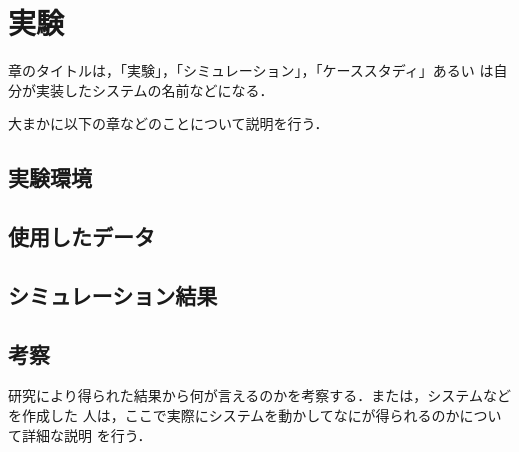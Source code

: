 \chapter{実験}
章のタイトルは，「実験」，「シミュレーション」，「ケーススタディ」あるい
は自分が実装したシステムの名前などになる．

大まかに以下の章などのことについて説明を行う．
\section{実験環境}
\section{使用したデータ}
\section{シミュレーション結果}
\section{考察}
研究により得られた結果から何が言えるのかを考察する．または，システムなどを作成した
人は，ここで実際にシステムを動かしてなにが得られるのかについて詳細な説明
を行う．
